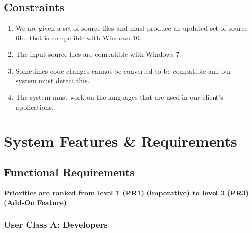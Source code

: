 \documentclass[12pt]{article}
\begin{document}
\subsection{Constraints}

\begin{enumerate}
    \item We are given a set of source files and must produce an updated set of source files that is compatible with Windows 10.
    \item The input source files are compatible with Windows 7.
    \item Sometimes code changes cannot be converted to be compatible and our system must detect this.
    \item The system must work on the languages that are used in our client's applications.
\end{enumerate}

\section{System Features \& Requirements}

\subsection{Functional Requirements}

\textbf{Priorities are ranked from level 1 (PR1) (imperative) to level 3 (PR3) (Add-On Feature)}

\subsubsection{User Class A: Developers}
\end{document}
